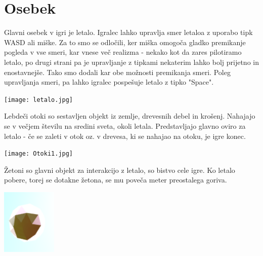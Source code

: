 \documentclass[a4paper]{article}
\begin{document}
\section{Osebek}%
Glavni osebek v igri je letalo. Igralec lahko upravlja smer letaloa z uporabo tipk WASD ali miške. Za to smo se odločili, ker miška omogoča gladko premikanje pogleda v vse smeri, kar vnese več realizma - nekako kot da zares pilotiramo letalo, po drugi strani pa je upravljanje z tipkami nekaterim lahko bolj prijetno in enostavnejše. Tako smo dodali kar obe možnosti premikanja smeri. Poleg upravljanja smeri, pa lahko igralec pospešuje letalo z tipko "Space". 

\begin{center}
     \texttt{[image: letalo.jpg]}
\end{center}

Lebdeči otoki so sestavljen objekt iz zemlje, drevesnih debel in krošenj. Nahajajo se v večjem številu na sredini sveta, okoli letala. Predstavljajo glavno oviro za letalo - če se zaleti v otok oz. v drevesa, ki se nahajao na otoku, je igre konec. 
\begin{center}
     \texttt{[image: Otoki1.jpg]}
\end{center}

Žetoni so glavni objekt za interakcijo z letalo, so bistvo cele igre. Ko letalo pobere, torej se dotakne žetona, se mu poveča meter preostalega goriva.
\begin{center}
     \includegraphics[width=\columnwidth]{zeton.jpg}
\end{center}
\end{document}

